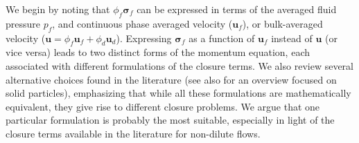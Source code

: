 
We begin by noting that $\phi_f\bm\sigma_f$ can be expressed in terms of the averaged fluid pressure $p_f$, and continuous phase averaged velocity ($\textbf{u}_f$), or bulk-averaged velocity ($\textbf{u} = \phi_f \textbf{u}_f + \phi_d \textbf{u}_d$).
Expressing $\bm\sigma_f$ as a function of $\textbf{u}_f$ instead of $\textbf{u}$ (or vice versa) leads to two distinct forms of the momentum equation, each associated with different formulations of the closure terms. 
We also review several alternative choices found in the literature (see also \citet{jackson2000, pahtz2025general} for an overview focused on solid particles), emphasizing that while all these formulations are mathematically equivalent, they give rise to different closure problems. 
We argue that one particular formulation is probably the most suitable, especially in light of the closure terms available in the literature for non-dilute flows.%


